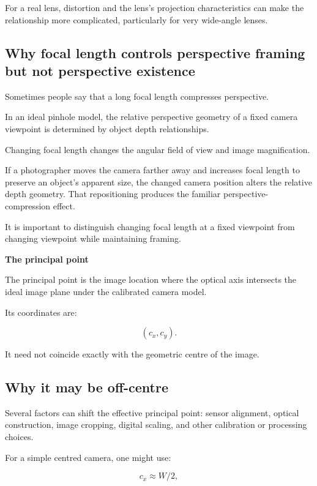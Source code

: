 For a real lens, distortion and the lens's projection characteristics can make the relationship more complicated, particularly for very wide-angle lenses.

\subsection{Why focal length controls perspective framing but not perspective existence}\label{02-foundations-ii-ch034-why-focal-length-controls-perspective-framing-but-not-perspective-existence}

Sometimes people say that a long focal length compresses perspective.

In an ideal pinhole model, the relative perspective geometry of a fixed camera viewpoint is determined by object depth relationships.

Changing focal length changes the angular field of view and image magnification.

If a photographer moves the camera farther away and increases focal length to preserve an object's apparent size, the changed camera position alters the relative depth geometry. That repositioning produces the familiar perspective-compression effect.

It is important to distinguish changing focal length at a fixed viewpoint from changing viewpoint while maintaining framing.

\textbf{The principal point}

The principal point is the image location where the optical axis intersects the ideal image plane under the calibrated camera model.

Its coordinates are:

\[
 \boxed{(c_x,c_y)}.
\]

It need not coincide exactly with the geometric centre of the image.

\subsection{Why it may be off-centre}\label{02-foundations-ii-ch034-why-it-may-be-off-centre}

Several factors can shift the effective principal point: sensor alignment, optical construction, image cropping, digital scaling, and other calibration or processing choices.

For a simple centred camera, one might use:

\[
 c_x\approx W/2,
\]

